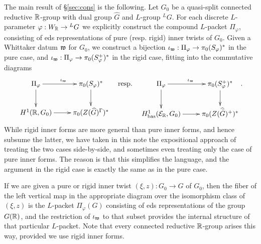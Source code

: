 \documentclass{article}
\theoremstyle{definition}
\numberwithin{equation}{section}
\renewcommand{\-}{\hyp{}}
\begin{document}
The main result of \S\ref{sec:cons} is the following. Let $G_0$ be a quasi-split connected reductive $\mathbb{R}$-group with dual group $\hat G$ and $L$-group $^LG$. For each discrete $L$-parameter $\varphi : W_{\mathbb{R}} \to {^LG}$ we explicitly construct the compound $L$-packet $\Pi_\varphi$, consisting of eds representations of pure (resp. rigid) inner twists of $G_0$. Given a Whittaker datum $\mathfrak{w}$ for $G_0$, we construct a bijection $\iota_{\mathfrak{w}} : \Pi_\varphi \to \pi_0(S_\varphi)^*$ in the pure case, and $\iota_{\mathfrak{w}} : \Pi_\varphi \to \pi_0(S_\varphi^+)^*$ in the rigid case, fitting into the commutative diagrams
\[ \xymatrix{
	\Pi_\varphi\ar[r]^{\iota_\mf{w}}\ar[d]&\pi_0(S_\varphi)^*\ar[d]\\
	H^1(\R,G_0)\ar[r]&\pi_0(Z(\hat G)^\Gamma)^*
}\quad\tx{resp.}\quad
\xymatrix{
	\Pi_\varphi\ar[r]^{\iota_\mf{w}}\ar[d]&\pi_0(S_\varphi^+)^*\ar[d]\\
	H^1_\tx{bas}(\mc{E}_\R,G_0)\ar[r]&\pi_0(Z(\hat{\bar G})^+)^*
}.
\]
While rigid inner forms are more general than pure inner forms, and hence subsume the latter, we have taken in this note the expositional approach of treating the two cases side-by-side, and sometimes even treating only the case of pure inner forms. The reason is that this simplifies the language, and the argument in the rigid case is exactly the same as in the pure case.

If we are given a pure or rigid inner twist $(\xi,z) : G_0 \to G$  of $G_0$, then the fiber of the left vertical map in the appropriate diagram over the isomorphism class of $(\xi,z)$ is the $L$-packet $\Pi_\varphi(G)$ consisting of eds representations of the group $G(\mathbb{R})$, and the restriction of $\iota_{\mathfrak{w}}$ to that subset provides the internal structure of that particular $L$-packet. Note that every connected reductive $\mathbb{R}$-group arises this way, provided we use rigid inner forms.
\end{document}
